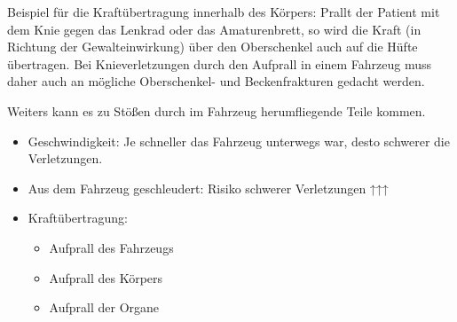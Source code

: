 {\begin{itemize}
  Beispiel für die Kraftübertragung innerhalb des Körpers:
  Prallt der Patient mit dem Knie gegen das Lenkrad oder das
  Amaturenbrett, so wird die Kraft (in Richtung der
  Gewalteinwirkung) über den Oberschenkel auch auf die Hüfte
  übertragen. Bei Knieverletzungen durch den Aufprall in
  einem Fahrzeug muss daher auch an mögliche Oberschenkel-
  und Beckenfrakturen gedacht werden.
\end{itemize}
Weiters kann es zu Stößen durch im Fahrzeug herumfliegende
Teile kommen. 
\cite{ITLSde6,RedelsteinerHRNS1,BoehmerTaschRett6} 
}{
\begin{itemize}
  \item Geschwindigkeit: Je schneller das Fahrzeug unterwegs
   war, desto schwerer die Verletzungen.
  \item Aus dem Fahrzeug geschleudert: Risiko  schwerer Verletzungen ↑↑↑
  \item Kraftübertragung:
  \begin{itemize}
    \item Aufprall des Fahrzeugs
    \item Aufprall des Körpers
    \item Aufprall der Organe
  \end{itemize}
\end{itemize}
}{}{}{}


